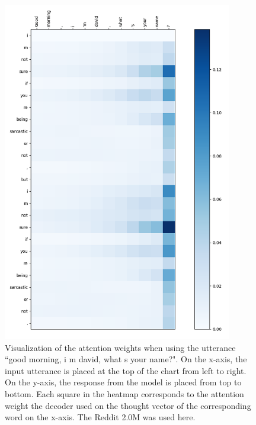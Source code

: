 \begin{figure}[H]
	\centering
	\includegraphics[width=10cm]{img/attention/attention_visualization1_reddit_2m.png}
	\caption{Visualization of the attention weights when using the utterance ``good morning, i m david, what s your name?". On the x-axis, the input utterance is placed at the top of the chart from left to right. On the y-axis, the response from the model is placed from top to bottom. Each square in the heatmap corresponds to the attention weight the decoder used on the thought vector of the corresponding word on the x-axis. The Reddit 2.0M was used here.}
	\label{results:attention:example1:reddit}
\end{figure}

